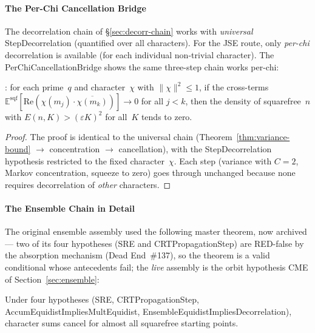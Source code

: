 \paragraph{The Per-Chi Cancellation Bridge}
\label{sec:per-chi}

The decorrelation chain of \S\ref{sec:decorr-chain} works with
\emph{universal} StepDecorrelation (quantified over all characters).
For the JSE route, only \emph{per-chi} decorrelation is available (for
each individual non-trivial character).  The PerChiCancellationBridge
shows the same three-step chain works per-chi:

\begin{theorem}
\label{thm:per-chi}
: for each prime~$q$ and
character~$\chi$ with $\|\chi\|^2 \leq 1$, if the cross-terms
$\mathbb{E}^{\mathrm{sqf}}[\mathrm{Re}(\chi(m_j) \cdot
\overline{\chi(m_k)})] \to 0$ for all $j < k$, then the density of
squarefree~$n$ with $E(n, K) > (\varepsilon K)^2$ for all~$K$ tends
to zero.
\end{theorem}

\begin{proof}
The proof is identical to the universal chain (Theorem~\ref{thm:variance-bound}
$\to$ concentration $\to$ cancellation), with the StepDecorrelation
hypothesis restricted to the fixed character~$\chi$.  Each step
(variance with $C = 2$, Markov concentration, squeeze to zero) goes
through unchanged because none requires decorrelation of \emph{other}
characters.
\end{proof}

\paragraph{The Ensemble Chain in Detail}
\label{sec:ensemble-chain}

The original ensemble assembly used the following master theorem, now
archived --- two of its four hypotheses (SRE and CRTPropagationStep)
are RED-false by the absorption mechanism (Dead End~\#137), so the
theorem is a valid conditional whose antecedents fail; the \emph{live}
assembly is the orbit hypothesis CME of Section~\ref{sec:ensemble}:

\begin{theorem}
Under four hypotheses (SRE, CRTPropagationStep,
AccumEquidistImpliesMultEquidist, EnsembleEquidistImpliesDecorrelation),
character sums cancel for almost all squarefree starting points.
\end{theorem}

